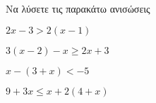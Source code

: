 Να λύσετε τις παρακάτω ανισώσεις
\begin{alist}
\item $ 2x-3>2(x-1) $
\item $ 3(x-2)-x\geq 2x+3 $
\item $ x-(3+x)<-5 $
\item $ 9+3x\leq x+2(4+x) $
\end{alist}
